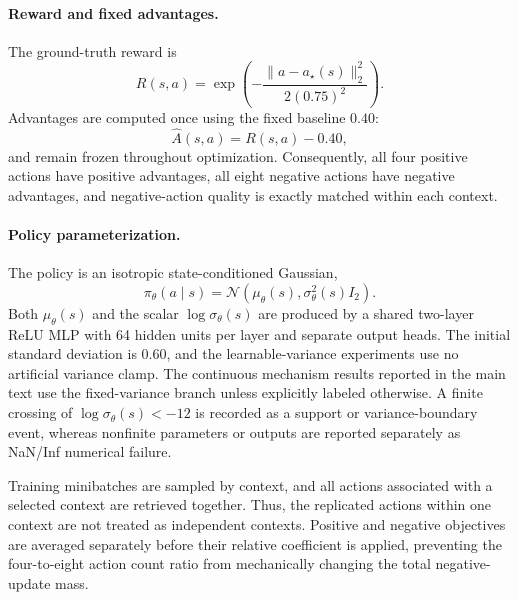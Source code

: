 \documentclass[sigconf,anonymous,review]{acmart}
\theoremstyle{acmdefinition}
\begin{document}
\paragraph{Reward and fixed advantages.}
The ground-truth reward is
\begin{equation}
    R(s,a)
    =
    \exp
    \left(
        -
        \frac{
            \lVert a-a_\star(s)\rVert_2^2
        }{
            2(0.75)^2
        }
    \right).
    \label{eq:cu1_reward}
\end{equation}
Advantages are computed once using the fixed baseline $0.40$:
\begin{equation}
    \widehat A(s,a)
    =
    R(s,a)-0.40,
    \label{eq:cu1_advantage}
\end{equation}
and remain frozen throughout optimization. Consequently, all four
positive actions have positive advantages, all eight negative actions
have negative advantages, and negative-action quality is exactly matched
within each context.

\paragraph{Policy parameterization.}
The policy is an isotropic state-conditioned Gaussian,
\begin{equation}
    \pi_\theta(a\mid s)
    =
    \mathcal N
    \left(
        \mu_\theta(s),
        \sigma_\theta^2(s)I_2
    \right).
    \label{eq:cu1_policy}
\end{equation}
Both $\mu_\theta(s)$ and the scalar
$\log\sigma_\theta(s)$
are produced by a shared two-layer ReLU MLP with 64 hidden units per
layer and separate output heads. The initial standard deviation is
$0.60$, and the learnable-variance experiments use no artificial
variance clamp.  The continuous mechanism results reported in the main
text use the fixed-variance branch unless explicitly labeled otherwise. A finite crossing of
$\log\sigma_\theta(s)<-12$
is recorded as a support or variance-boundary event, whereas nonfinite
parameters or outputs are reported separately as NaN/Inf numerical
failure.

Training minibatches are sampled by context, and all actions associated
with a selected context are retrieved together. Thus, the replicated
actions within one context are not treated as independent contexts.
Positive and negative objectives are averaged separately before their
relative coefficient is applied, preventing the four-to-eight action
count ratio from mechanically changing the total negative-update mass.
\end{document}
